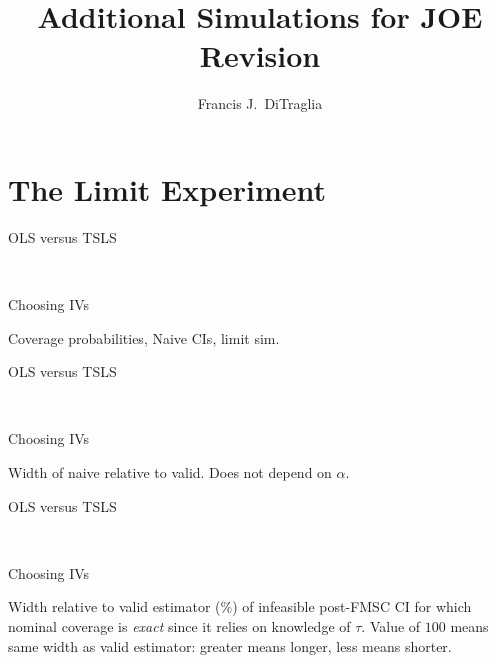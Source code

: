 \documentclass[12pt,letterpaper]{article}
\title{Additional Simulations for JOE Revision}
\author{Francis J.\ DiTraglia}
\begin{document}
\maketitle

\section{The Limit Experiment}

\begin{table}[h]
  \centering
  \begin{subtable}{0.48\textwidth}
    \caption{OLS versus TSLS}
    
  \end{subtable}
  ~
  \begin{subtable}{0.48\textwidth}
    \caption{Choosing IVs}
    
  \end{subtable}
  \label{tab:LimitNaiveCover}
  \caption{Coverage probabilities, Naive CIs, limit sim.}
\end{table}

\begin{table}[h]
  \centering
  \begin{subtable}{0.48\textwidth}
    \caption{OLS versus TSLS}
    
  \end{subtable}
  ~
  \begin{subtable}{0.48\textwidth}
    \caption{Choosing IVs}
    
  \end{subtable}
  \label{tab:LimitNaiveWidth}
  \caption{Width of naive relative to valid. Does not depend on $\alpha$.}
\end{table}

\begin{table}[h]
  \centering
  \begin{subtable}{0.48\textwidth}
    \caption{OLS versus TSLS}
    
  \end{subtable}
  ~
  \begin{subtable}{0.48\textwidth}
    \caption{Choosing IVs}
    
  \end{subtable}
  \label{tab:WidthInfeasible}
  \caption{Width relative to valid estimator (\%) of infeasible post-FMSC CI for which nominal coverage is \emph{exact} since it relies on knowledge of $\tau$. Value of $100$ means same width as valid estimator: greater means longer, less means shorter.}
\end{table}
\end{document}
